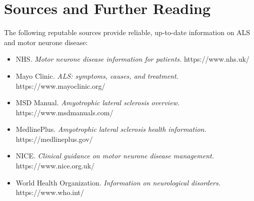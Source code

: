 \section*{Sources and Further Reading}
The following reputable sources provide reliable, up-to-date information on ALS and motor neurone disease:

\begin{itemize}
    \item NHS. \textit{Motor neurone disease information for patients.} https://www.nhs.uk/
    \item Mayo Clinic. \textit{ALS: symptoms, causes, and treatment.} https://www.mayoclinic.org/
    \item MSD Manual. \textit{Amyotrophic lateral sclerosis overview.} https://www.msdmanuals.com/
    \item MedlinePlus. \textit{Amyotrophic lateral sclerosis health information.} https://medlineplus.gov/
    \item NICE. \textit{Clinical guidance on motor neurone disease management.} https://www.nice.org.uk/
    \item World Health Organization. \textit{Information on neurological disorders.} https://www.who.int/
\end{itemize}
